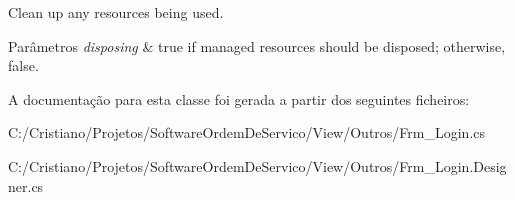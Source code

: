 Clean up any resources being used. 


\begin{DoxyParams}{Parâmetros}
{\em disposing} & true if managed resources should be disposed; otherwise, false.\\
\hline
\end{DoxyParams}


A documentação para esta classe foi gerada a partir dos seguintes ficheiros\+:\begin{DoxyCompactItemize}
\item 
C\+:/\+Cristiano/\+Projetos/\+Software\+Ordem\+De\+Servico/\+View/\+Outros/Frm\+\_\+\+Login.\+cs\item 
C\+:/\+Cristiano/\+Projetos/\+Software\+Ordem\+De\+Servico/\+View/\+Outros/Frm\+\_\+\+Login.\+Designer.\+cs\end{DoxyCompactItemize}
